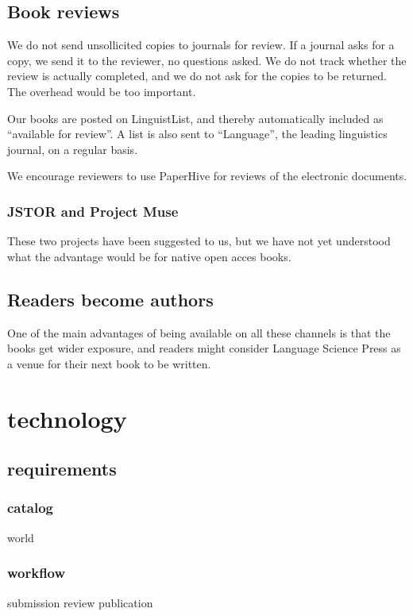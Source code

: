 \documentclass[output=guidelines,guidelines] {langscibook}
\begin{document}
\subsection{Book reviews}
We do not send unsollicited copies to journals for review. If a journal asks for a copy, we send it to the reviewer, no questions asked. We do not track whether the review is actually completed, and we do not ask for the copies to be returned. The overhead would be too important. 

Our books are posted on LinguistList, and thereby automatically included as ``available for review''. A list is also sent to ``Language'', the leading linguistics journal, on a regular basis. 

We encourage reviewers to use PaperHive for reviews of the electronic documents.

                      
\subsubsection{JSTOR and Project Muse}                      
These two projects have been suggested to us, but we have not yet understood what the advantage would be for native open acces books.


\subsection{Readers become authors}
One of the main advantages of being available on all these channels is that the books get wider exposure, and readers might consider Language Science Press as a venue for their next book to be written. %


                    
                    
\section{technology}
\subsection{requirements}
\subsubsection{catalog}
                    world
\subsubsection{workflow}
                    submission
                    review
                    publication
\end{document}
